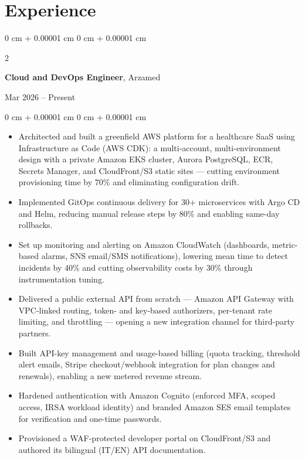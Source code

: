 \documentclass[10pt, letterpaper]{article}
\newenvironment{highlights}{
    \begin{itemize}[
        topsep=0.10 cm,
        parsep=0.10 cm,
        partopsep=0pt,
        itemsep=0pt,
        leftmargin=0 cm + 10pt
    ]
}{
    \end{itemize}
} %
\newenvironment{onecolentry}{
    \begin{adjustwidth}{
        0 cm + 0.00001 cm
    }{
        0 cm + 0.00001 cm
    }
}{
    \end{adjustwidth}
} %
\newenvironment{twocolentry}[2][]{
    \onecolentry
    \def\secondColumn{#2}
    \setcolumnwidth{\fill, 4.5 cm}
    \begin{paracol}{2}
}{
    \switchcolumn \raggedleft \secondColumn
    \end{paracol}
    \endonecolentry
} %
\begin{document}
            \section{Experience}
                \begin{twocolentry}{Mar 2026 -- Present}
                    \textbf{Cloud and DevOps Engineer}, Arzamed
                \end{twocolentry}
                \vspace{0.10 cm}
                \begin{onecolentry}
                    \begin{highlights}
                        \item Architected and built a greenfield AWS platform for a healthcare SaaS using Infrastructure as Code (AWS CDK): a multi-account, multi-environment design with a private Amazon EKS cluster, Aurora PostgreSQL, ECR, Secrets Manager, and CloudFront/S3 static sites --- cutting environment provisioning time by 70\% and eliminating configuration drift.
                        \item Implemented GitOps continuous delivery for 30+ microservices with Argo CD and Helm, reducing manual release steps by 80\% and enabling same-day rollbacks.
                        \item Set up monitoring and alerting on Amazon CloudWatch (dashboards, metric-based alarms, SNS email/SMS notifications), lowering mean time to detect incidents by 40\% and cutting observability costs by 30\% through instrumentation tuning.
                        \item Delivered a public external API from scratch --- Amazon API Gateway with VPC-linked routing, token- and key-based authorizers, per-tenant rate limiting, and throttling --- opening a new integration channel for third-party partners.
                        \item Built API-key management and usage-based billing (quota tracking, threshold alert emails, Stripe checkout/webhook integration for plan changes and renewals), enabling a new metered revenue stream.
                        \item Hardened authentication with Amazon Cognito (enforced MFA, scoped access, IRSA workload identity) and branded Amazon SES email templates for verification and one-time passwords.
                        \item Provisioned a WAF-protected developer portal on CloudFront/S3 and authored its bilingual (IT/EN) API documentation.
                    \end{highlights}
                \end{onecolentry}
\end{document}
